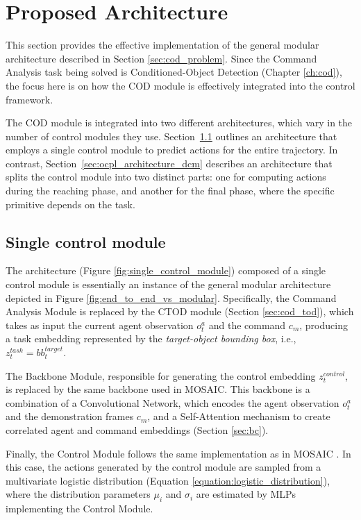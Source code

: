 \section{Proposed Architecture}
\label{sec:ocpl_architecture}
This section provides the effective implementation of the general modular architecture described in Section \ref{sec:cod_problem}. Since the Command Analysis task being solved is Conditioned-Object Detection (Chapter \ref{ch:cod}), the focus here is on how the COD module is effectively integrated into the control framework.

The COD module is integrated into two different architectures, which vary in the number of control modules they use. Section~\ref{sec:ocpl_architecture_scm} outlines an architecture that employs a single control module to predict actions for the entire trajectory. In contrast, Section~\ref{sec:ocpl_architecture_dcm} describes an architecture that splits the control module into two distinct parts: one for computing actions during the reaching phase, and another for the final phase, where the specific primitive depends on the task.

\subsection{Single control module}
\label{sec:ocpl_architecture_scm}
The architecture (Figure \ref{fig:single_control_module}) composed of a single control module is essentially an instance of the general modular architecture depicted in Figure \ref{fig:end_to_end_vs_modular}. Specifically, the Command Analysis Module is replaced by the CTOD module (Section \ref{sec:cod_tod}), which takes as input the current agent observation $o^a_t$ and the command $c_m$, producing a task embedding represented by the \textit{target-object bounding box}, i.e., $z^{task}_t = bb^{target}_t$.

The Backbone Module, responsible for generating the control embedding $z^{control}_{t}$, is replaced by the same backbone used in MOSAIC. This backbone is a combination of a Convolutional Network, which encodes the agent observation $o^a_t$ and the demonstration frames $c_m$, and a Self-Attention mechanism to create correlated agent and command embeddings (Section \ref{sec:bc}). 

Finally, the Control Module follows the same implementation as in MOSAIC \cite{mandi2022towards_more_generalizable_one_shot}. In this case, the actions generated by the control module are sampled from a multivariate logistic distribution (Equation \ref{equation:logistic_distribution}), where the distribution parameters $\mu_{i}$ and $\sigma_{i}$ are estimated by MLPs implementing the Control Module.

